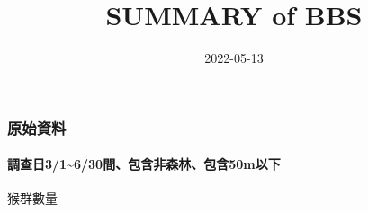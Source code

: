 \documentclass[
]{article}
\title{SUMMARY of BBS}
\author{}
\date{\vspace{-2.5em}2022-05-13}
\begin{document}
\maketitle

\hypertarget{ux539fux59cbux8cc7ux6599}{%
\subsubsection{\texorpdfstring{\textbf{原始資料}}{原始資料}}\label{ux539fux59cbux8cc7ux6599}}

\hypertarget{ux8abfux67e5ux65e531630ux9593ux5305ux542bux975eux68eeux6797ux5305ux542b50mux4ee5ux4e0b}{%
\paragraph{\texorpdfstring{\textbf{調查日3/1\textasciitilde6/30間、包含非森林、包含50m以下}}{調查日3/1\textasciitilde6/30間、包含非森林、包含50m以下}}\label{ux8abfux67e5ux65e531630ux9593ux5305ux542bux975eux68eeux6797ux5305ux542b50mux4ee5ux4e0b}}

猴群數量

\providecommand{\docline}[3]{\noalign{\global\setlength{\arrayrulewidth}{#1}}\arrayrulecolor[HTML]{#2}\cline{#3}}

\setlength{\tabcolsep}{2pt}

\renewcommand*{\arraystretch}{1.5}
\end{document}
